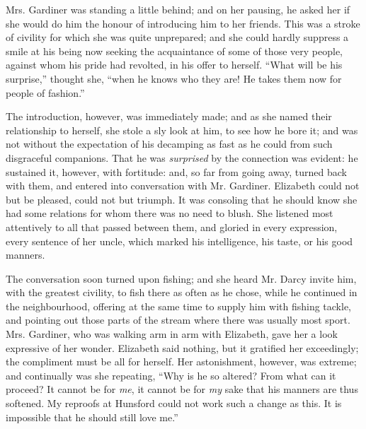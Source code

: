 \documentclass[12pt]{book}
\begin{document}
Mrs. Gardiner was standing a little behind; and on her pausing, he asked her if she would do him the honour of introducing him to her friends. This was a stroke of civility for which she was quite unprepared; and she could hardly suppress a smile at his being now seeking the acquaintance of some of those very people, against whom his pride had revolted, in his offer to herself. ``What will be his surprise,'' thought she, ``when he knows who they are! He takes them now for people of fashion.''

The introduction, however, was immediately made; and as she named their relationship to herself, she stole a sly look at him, to see how he bore it; and was not without the expectation of his decamping as fast as he could from such disgraceful companions. That he was \textit{surprised} by the connection was evident: he sustained it, however, with fortitude: and, so far from going away, turned back with them, and entered into conversation with Mr. Gardiner. Elizabeth could not but be pleased, could not but triumph. It was consoling that he should know she had some relations for whom there was no need to blush. She listened most attentively to all that passed between them, and gloried in every expression, every sentence of her uncle, which marked his intelligence, his taste, or his good manners.

The conversation soon turned upon fishing; and she heard Mr. Darcy invite him, with the greatest civility, to fish there as often as he chose, while he continued in the neighbourhood, offering at the same time to supply him with fishing tackle, and pointing out those parts of the stream where there was usually most sport. Mrs. Gardiner, who was walking arm in arm with Elizabeth, gave her a look expressive of her wonder. Elizabeth said nothing, but it gratified her exceedingly; the compliment must be all for herself. Her astonishment, however, was extreme; and continually was she repeating, ``Why is he so altered? From what can it proceed? It cannot be for \textit{me}, it cannot be for \textit{my} sake that his manners are thus softened. My reproofs at Hunsford could not work such a change as this. It is impossible that he should still love me.''
\end{document}
